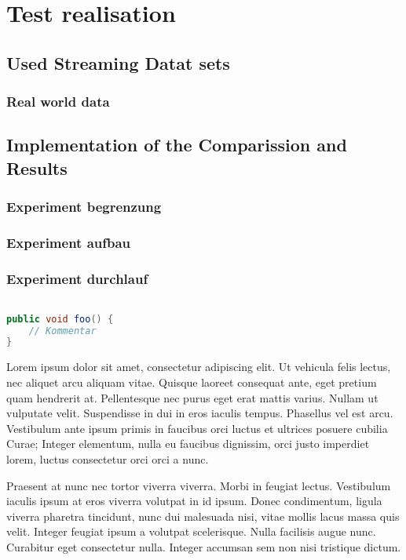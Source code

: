 \documentclass[12pt,oneside,a4paper,parskip]{scrbook}
\begin{document}
\chapter{Test realisation}

\section{Used Streaming Datat sets}

\subsection{Real world data}

\section{Implementation of the Comparission and Results}

\subsection{Experiment begrenzung}

\subsection{Experiment aufbau}

\subsection{Experiment durchlauf}

\begin{lstlisting}[label=lst:java,
				   language=java,
				   firstnumber=1,
				   caption=Beispiel für einen Quelltext]				   

public void foo() {				   
	// Kommentar
}
\end{lstlisting}

Lorem ipsum dolor sit amet, consectetur adipiscing elit. Ut vehicula felis lectus, nec aliquet arcu aliquam vitae. Quisque laoreet consequat ante, eget pretium quam hendrerit at. Pellentesque nec purus eget erat mattis varius. Nullam ut vulputate velit. Suspendisse in dui in eros iaculis tempus. Phasellus vel est arcu. Vestibulum ante ipsum primis in faucibus orci luctus et ultrices posuere cubilia Curae; Integer elementum, nulla eu faucibus dignissim, orci justo imperdiet lorem, luctus consectetur orci orci a nunc.

Praesent at nunc nec tortor viverra viverra. Morbi in feugiat lectus. Vestibulum iaculis ipsum at eros viverra volutpat in id ipsum. Donec condimentum, ligula viverra pharetra tincidunt, nunc dui malesuada nisi, vitae mollis lacus massa quis velit. Integer feugiat ipsum a volutpat scelerisque. Nulla facilisis augue nunc. Curabitur eget consectetur nulla. Integer accumsan sem non nisi tristique dictum.
\end{document}
